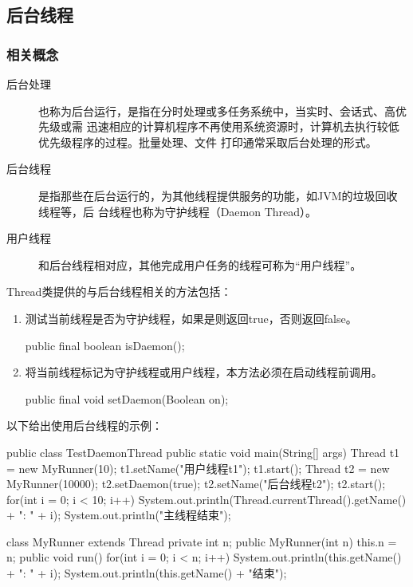 \subsection{后台线程}

\subsubsection{相关概念}
\begin{description}
\item[后台处理] 也称为后台运行，是指在分时处理或多任务系统中，当实时、会话式、高优先级或需
迅速相应的计算机程序不再使用系统资源时，计算机去执行较低优先级程序的过程。批量处理、文件
打印通常采取后台处理的形式。
\item[后台线程] 是指那些在后台运行的，为其他线程提供服务的功能，如JVM的垃圾回收线程等，后
台线程也称为守护线程（Daemon Thread）。
\item[用户线程] 和后台线程相对应，其他完成用户任务的线程可称为“用户线程”。
\end{description}

Thread类提供的与后台线程相关的方法包括：

\begin{enumerate}
\item 测试当前线程是否为守护线程，如果是则返回true，否则返回false。
\begin{javaCode}
public final boolean isDaemon();
\end{javaCode}
\item 将当前线程标记为守护线程或用户线程，本方法必须在启动线程前调用。
\begin{javaCode}
public final void setDaemon(Boolean on);
\end{javaCode}
\end{enumerate}

以下给出使用后台线程的示例：


\begin{javaCode}
public class TestDaemonThread {
  public static void main(String[] args) {
    Thread t1 = new MyRunner(10);
    t1.setName("用户线程t1");
    t1.start();
    Thread t2 = new MyRunner(10000);
    t2.setDaemon(true);
    t2.setName("后台线程t2");
    t2.start();
    for(int i = 0; i < 10; i++) {
      System.out.println(Thread.currentThread().getName() + ": " + i);
    }
    System.out.println("主线程结束");
  }
}

class MyRunner extends Thread {
  private int n;
  public MyRunner(int n) {
    this.n = n;
  }
  public void run() {
    for(int i = 0; i < n; i++) {
      System.out.println(this.getName() + ": " + i);
    }
    System.out.println(this.getName() + "结束");
  }
}  
\end{javaCode}


